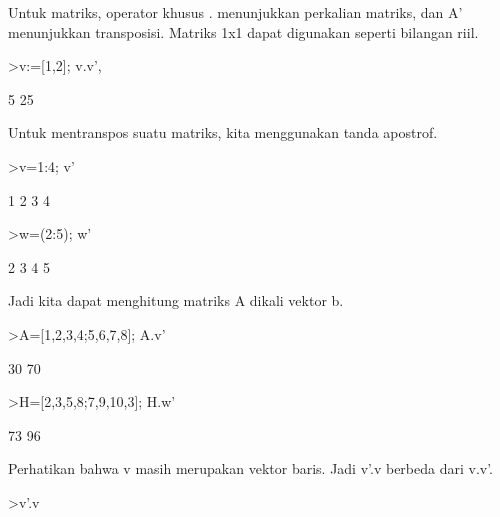 \documentclass[a4paper,10pt]{article}
\begin{document}
\begin{eulernotebook}
\begin{eulercomment}
\begin{eulercomment}
\begin{eulercomment}
\begin{eulercomment}
\begin{eulercomment}
\begin{eulercomment}
\begin{euleroutput}
  [1,  2,  3,  4]
\end{euleroutput}
\begin{eulercomment}
Untuk matriks, operator khusus . menunjukkan perkalian matriks, dan A'
menunjukkan transposisi. Matriks 1x1 dapat digunakan seperti bilangan
riil.
\end{eulercomment}
\begin{eulerprompt}
>v:=[1,2]; v.v', %
\end{eulerprompt}
\begin{euleroutput}
  5
  25
\end{euleroutput}
\begin{eulercomment}
Untuk mentranspos suatu matriks, kita menggunakan tanda apostrof.
\end{eulercomment}
\begin{eulerprompt}
>v=1:4; v'
\end{eulerprompt}
\begin{euleroutput}
                        1 
                        2 
                        3 
                        4 
\end{euleroutput}
\begin{eulerprompt}
>w=(2:5); w'
\end{eulerprompt}
\begin{euleroutput}
                        2 
                        3 
                        4 
                        5 
\end{euleroutput}
\begin{eulercomment}
Jadi kita dapat menghitung matriks A dikali vektor b.
\end{eulercomment}
\begin{eulerprompt}
>A=[1,2,3,4;5,6,7,8]; A.v'
\end{eulerprompt}
\begin{euleroutput}
                       30 
                       70 
\end{euleroutput}
\begin{eulerprompt}
>H=[2,3,5,8;7,9,10,3]; H.w'
\end{eulerprompt}
\begin{euleroutput}
                       73 
                       96 
\end{euleroutput}
\begin{eulercomment}
Perhatikan bahwa v masih merupakan vektor baris. Jadi v'.v berbeda
dari v.v'.
\end{eulercomment}
\begin{eulerprompt}
>v'.v
\end{eulerprompt}

\end{eulercomment}
\end{eulercomment}
\end{eulercomment}
\end{eulercomment}
\end{eulercomment}
\end{eulercomment}
\end{eulernotebook}
\end{document}
